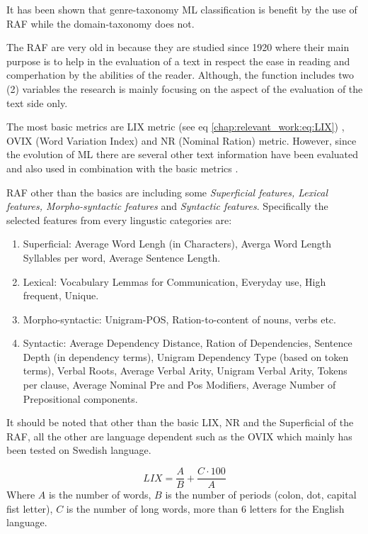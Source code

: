 It has been shown that genre-taxonomy ML classification is benefit by the use of RAF while the domain-taxonomy does not. 

The RAF are very old in because they are studied since 1920 where their main purpose is to help in the evaluation of a text in respect the ease in reading and comperhation by the abilities of the reader. Although, the function includes two (2) variables the research is mainly focusing on the aspect of the evaluation of the text side only. 

The most basic metrics are LIX metric (see eq \ref{chap:relevant_work:eq:LIX}) , OVIX (Word Variation Index) and NR (Nominal Ration) metric. However, since the evolution of ML there are several other text information have been evaluated and also used in combination with the basic metrics \parencite{falkenjack2013features}.

RAF other than the basics are including some \textit{Superficial features, Lexical features, Morpho-syntactic features} and \textit{Syntactic features}. Specifically the selected features from every lingustic categories are:

\begin{enumerate}
\item Superficial: Average Word Lengh (in Characters), Averga Word Length Syllables per word, Average Sentence Length.
\item Lexical: Vocabulary Lemmas for Communication, Everyday use, High frequent, Unique.
\item Morpho-syntactic: Unigram-POS, Ration-to-content of nouns, verbs etc.
\item Syntactic: Average Dependency Distance, Ration of Dependencies, Sentence Depth (in dependency terms), Unigram Dependency Type (based on token terms), Verbal Roots, Average Verbal Arity, Unigram Verbal Arity, Tokens per clause, Average Nominal Pre and Pos Modifiers, Average Number of Prepositional components.
\end{enumerate}

It should be noted that other than the basic LIX, NR and the Superficial of the RAF, all the other are language dependent such as the OVIX which mainly has been tested on Swedish language.

\begin{equation} \label{chap:relevant_work:eq:LIX}
	LIX = \frac{A}{B} + \frac{C \cdot 100}{A}
\end{equation}
Where $A$ is the number of words, $B$ is the number of periods (colon, dot, capital fist letter), $C$ is the number of long words, more than 6 letters for the English language. 

